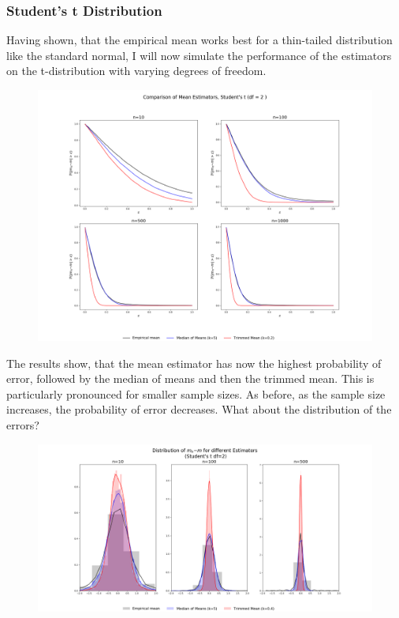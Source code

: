 \documentclass[a4paper, 11pt]{article} %
\begin{document}
\subsubsection{Student's t Distribution}

Having shown, that the empirical mean works best for a thin-tailed distribution like the standard normal, I will now simulate the performance of the estimators on the t-distribution with varying degrees of freedom.

\begin{figure}[H]
\centering
\includegraphics[scale=0.3]{Students_2df}
\end{figure}

\noindent The results show, that the mean estimator has now the highest probability of error, followed by the median of means and then the trimmed mean. This is particularly pronounced for smaller sample sizes. As before, as the sample size increases, the probability of error decreases. What about the distribution of the errors?

\begin{figure}[H]
\centering
\includegraphics[scale=0.25]{Studentsdf2_Dist_k5}
\end{figure}
\end{document}
